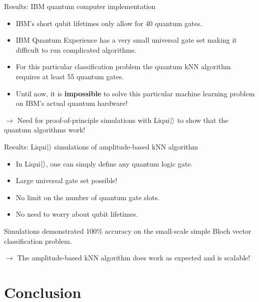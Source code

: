 \documentclass[10pt]{beamer}
\begin{document}
{
\begin{frame}{Results: IBM quantum computer implementation}

\begin{itemize}
\item IBM's short qubit lifetimes only allow for 40 quantum gates. 
\item IBM Quantum Experience has a very small universal gate set making it difficult to run complicated algorithms.
\item For this particular classification problem the quantum kNN algorithm requires at least 55 quantum gates.
\item Until now, it is \textbf{impossible} to solve this particular machine learning problem on IBM's actual quantum hardware!
\end{itemize}

$\rightarrow$ Need for proof-of-principle simulations with Liqui$\ket{}$ to show that the quantum algorithms work!

\end{frame}
}

{
\begin{frame}{Results: Liqui$\ket{}$ simulations of amplitude-based kNN algorithm}

\begin{itemize}
\item In Liqui$\ket{}$, one can simply define any quantum logic gate.
\item Large universal gate set possible!
\item No limit on the number of quantum gate slots.
\item No need to worry about qubit lifetimes.
\end{itemize}

Simulations demonstrated 100\% accuracy on the small-scale simple Bloch vector classification problem.

$\rightarrow$ The amplitude-based kNN algorithm does work as expected and is scalable!

\end{frame}
}

\section{Conclusion}
\end{document}

